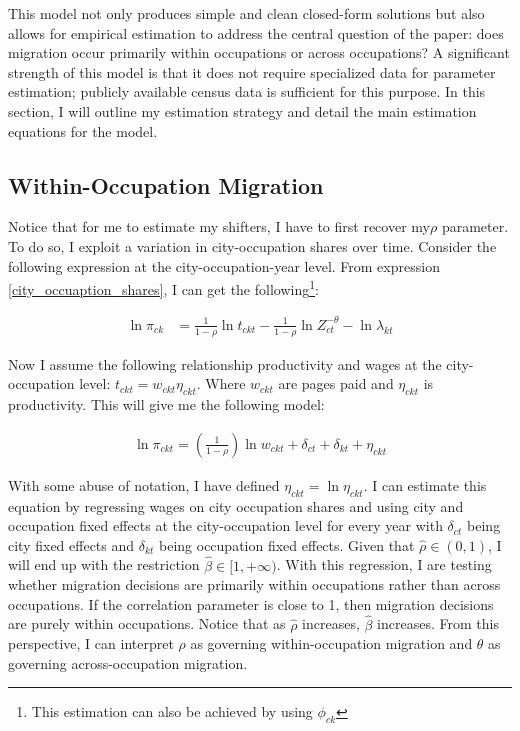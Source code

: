 \documentclass[10pt]{article}
\begin{document}
This model not only produces simple and clean closed-form solutions but also allows for empirical estimation to address the central question of the paper: does migration occur primarily within occupations or across occupations? A significant strength of this model is that it does not require specialized data for parameter estimation; publicly available census data is sufficient for this purpose. In this section, I will outline my estimation strategy and detail the main estimation equations for the model.

\subsection{Within-Occupation Migration}

Notice that for me to estimate my shifters, I have to first recover my$\rho$ parameter. To do so, I exploit a variation in city-occupation shares over time. Consider the following expression at the city-occupation-year level. From expression \ref{city_occuaption_shares}, I can get the following\footnote{This estimation can also be achieved by using $\phi_{ck}$}:

\begin{align*}
    \ln \pi_{ck} & = \frac{1}{1 - \rho} \ln t_{ckt} - \frac{1}{1 - \rho} \ln Z_{ct}^{- \theta} - \ln \lambda_{kt}
\end{align*}

Now I assume the following relationship productivity and wages at the city-occupation level: $t_{ckt} = w_{ckt} \eta_{ckt}$. Where $w_{ckt}$ are pages paid and $\eta_{ckt}$ is productivity. This will give me the following model:

\begin{align*}
    \ln \pi_{ckt} = \left( \frac{1}{1 - \rho} \right) \ln w_{ckt} + \delta_{ct} + \delta_{kt} + \eta_{ckt}
\end{align*}


With some abuse of notation, I have defined $\eta_{ckt} = \ln \eta_{ckt}$. I can estimate this equation by regressing wages on city occupation shares and using city and occupation fixed effects at the city-occupation level for every year with $\delta_{ct}$ being city fixed effects and $\delta_{kt}$ being occupation fixed effects. Given that $\hat{\rho} \in (0, 1)$, I will end up with the restriction $\hat{\beta} \in [1, +\infty)$. With this regression, I are testing whether migration decisions are primarily within occupations rather than across occupations. If the correlation parameter is close to 1, then migration decisions are purely within occupations. Notice that as $\hat{\rho}$ increases, $\hat{\beta}$ increases. From this perspective, I can interpret $\rho$ as governing within-occupation migration and $\theta$ as governing across-occupation migration.
\end{document}
